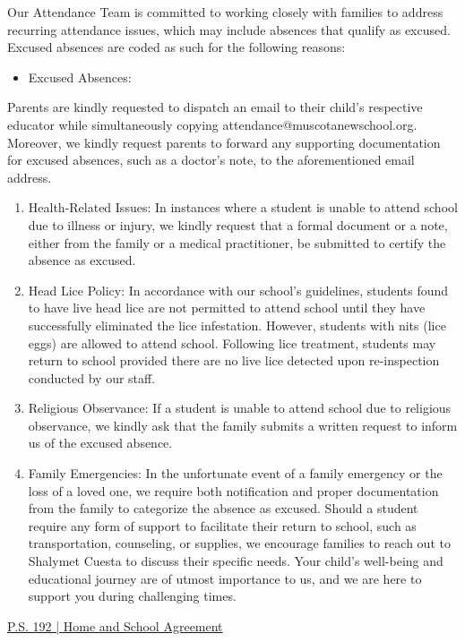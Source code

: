 \documentclass[11pt]{article}
\begin{document}
Our Attendance Team is committed to working closely with families to address recurring attendance issues, which may include absences that qualify as excused. Excused absences are coded as such for the following reasons:
\begin{itemize}
\item Excused Absences:
\end{itemize}
Parents are kindly requested to dispatch an email to their child’s respective educator
while simultaneously copying attendance@muscotanewschool.org. Moreover, we kindly request parents to forward any supporting documentation for excused absences, such as a doctor’s note, to the aforementioned email address.
\begin{enumerate}
\item Health-Related Issues: In instances where a student is unable to attend school due to illness or injury, we kindly request that a formal document or a note, either from the family or a medical practitioner, be submitted to certify the absence as excused.
\item Head Lice Policy: In accordance with our school’s guidelines, students found to have live head lice are not permitted to attend school until they have successfully eliminated the lice infestation. However, students with nits (lice eggs) are allowed to attend school. Following lice treatment, students may return to school provided there are no live lice detected upon re-inspection conducted by our staff.
\item Religious Observance: If a student is unable to attend school due to religious observance, we kindly ask that the family submits a written request to inform us of the excused absence.
\item Family Emergencies: In the unfortunate event of a family emergency or the loss of a loved one, we require both notification and proper documentation from the family to categorize the absence as excused. Should a student require any form of support to facilitate their return to school, such as transportation, counseling, or supplies, we encourage families to reach out to Shalymet Cuesta to discuss their specific needs. Your child’s well-being and educational journey are of utmost importance to us, and we are here to support you during challenging times.
\end{enumerate}

\href{https://4.files.edl.io/d109/09/17/23/012751-34dac161-8e19-4033-8c6b-f369007cab02.pdf}{P.S. 192 | Home and School Agreement}
\end{document}
